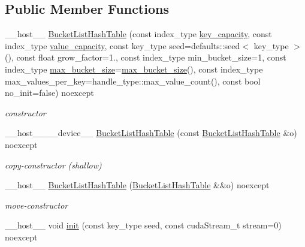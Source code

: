 \subsection*{Public Member Functions}
\begin{DoxyCompactItemize}
\item 
\+\_\+\+\_\+host\+\_\+\+\_\+ \hyperlink{classwarpcore_1_1BucketListHashTable_afc66a5887318d7daba8c901126324732}{Bucket\+List\+Hash\+Table} (const index\+\_\+type \hyperlink{classwarpcore_1_1BucketListHashTable_a7902d5c984290d262f5964f55a666765}{key\+\_\+capacity}, const index\+\_\+type \hyperlink{classwarpcore_1_1BucketListHashTable_a7777451fb2e8d4016f5baf2a0d22ced0}{value\+\_\+capacity}, const key\+\_\+type seed=defaults\+::seed$<$ key\+\_\+type $>$(), const float grow\+\_\+factor=1., const index\+\_\+type min\+\_\+bucket\+\_\+size=1, const index\+\_\+type \hyperlink{classwarpcore_1_1BucketListHashTable_a3b9c182c25464b5d6fa87d32f80fe281}{max\+\_\+bucket\+\_\+size}=\hyperlink{classwarpcore_1_1BucketListHashTable_a3b9c182c25464b5d6fa87d32f80fe281}{max\+\_\+bucket\+\_\+size}(), const index\+\_\+type max\+\_\+values\+\_\+per\+\_\+key=handle\+\_\+type\+::max\+\_\+value\+\_\+count(), const bool no\+\_\+init=false) noexcept
\begin{DoxyCompactList}\small\item\em constructor \end{DoxyCompactList}\item 
\+\_\+\+\_\+host\+\_\+\+\_\+\+\_\+\+\_\+device\+\_\+\+\_\+ \hyperlink{classwarpcore_1_1BucketListHashTable_aeb008a6264eb3ccf5ba4418f26a24f44}{Bucket\+List\+Hash\+Table} (const \hyperlink{classwarpcore_1_1BucketListHashTable}{Bucket\+List\+Hash\+Table} \&o) noexcept
\begin{DoxyCompactList}\small\item\em copy-\/constructor (shallow) \end{DoxyCompactList}\item 
\+\_\+\+\_\+host\+\_\+\+\_\+ \hyperlink{classwarpcore_1_1BucketListHashTable_a6eda53374bf552d12001a8b251262766}{Bucket\+List\+Hash\+Table} (\hyperlink{classwarpcore_1_1BucketListHashTable}{Bucket\+List\+Hash\+Table} \&\&o) noexcept
\begin{DoxyCompactList}\small\item\em move-\/constructor \end{DoxyCompactList}\item 
\+\_\+\+\_\+host\+\_\+\+\_\+ void \hyperlink{classwarpcore_1_1BucketListHashTable_ad819d76bcb890e6ebec9dd9cfa218be3}{init} (const key\+\_\+type seed, const cuda\+Stream\+\_\+t stream=0) noexcept

\end{DoxyCompactItemize}
